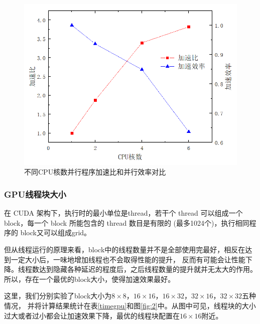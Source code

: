 \documentclass[UTF8]{ctexart}
\begin{document}
        \begin{figure}[H]
            \centering
            \includegraphics[scale=0.40]{./figures/fig1.png}
            \caption{\textup{\heiti 不同CPU核数并行程序加速比和并行效率对比} }
            \label{fig:1}
        \end{figure}
        
        \subsubsection{GPU线程块大小}
        在 CUDA 架构下，执行时的最小单位是thread，若干个 thread 可以组成一个block，每一个 block 所能包含的 thread 数目是有限的
        (最多1024个)，执行相同程序的 block又可以组成grid。

        但从线程运行的原理来看，block中的线程数量并不是全部使用完最好，相反在达到一定大小后，一味地增加线程也不会取得性能的提升，
        反而有可能会让性能下降。线程数达到隐藏各种延迟的程度后，之后线程数量的提升就并无太大的作用。
        所以，存在一个最优的block大小，使得加速效果最好。

        这里，我们分别实验了block大小为$8\times8$，$16\times16$，$16\times32$，$32\times16$，$32\times32$五种情况，
        并将计算结果统计在表\ref{timegpu}和图\ref{fig:2}中。从图中可见，线程块的大小过大或者过小都会让加速效果下降，最优的线程块配置在$16\times16$附近。
\end{document}
